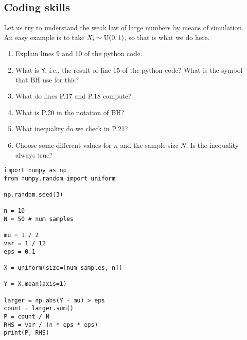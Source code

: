 \documentclass[assignments]{subfiles}
\begin{document}
\subsection{Coding skills}

\begin{exercise}
Let us try to understand the weak law of large numbers by means of simulation. An easy example is to take $X_{i}\sim\mathrm{U}(0,1)$, so that is what we do here.

\begin{enumerate}
\item Explain lines 9 and 10 of the python code.  
\item What is \texttt{Y}, i.e., the result of line 15 of the python code? What is the symbol that BH use for this? 
\item What do lines P.17 and P.18 compute? 
\item What is P.20 in the notation of BH?
\item What inequality do we check in P.21?
\item Choose some different values for $n$ and the sample size $N$. Is the inequality always true? 
\end{enumerate}

\begin{verbatim}
import numpy as np
from numpy.random import uniform

np.random.seed(3)

n = 10
N = 50 # num samples

mu = 1 / 2
var = 1 / 12
eps = 0.1

X = uniform(size=[num_samples, n])

Y = X.mean(axis=1)

larger = np.abs(Y - mu) > eps
count = larger.sum()
P = count / N
RHS = var / (n * eps * eps)
print(P, RHS)
\end{verbatim}

\end{exercise}
\end{document}
